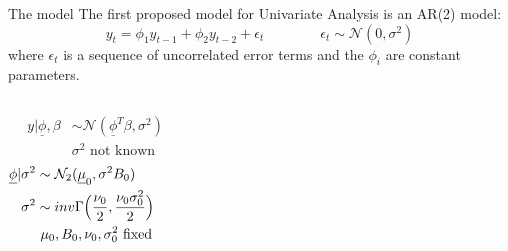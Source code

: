 \documentclass[10pt]{beamer}
\theoremstyle{remark}
\theoremstyle{definition}
\begin{document}
\begin{frame}{The model}
    The first proposed model for Univariate Analysis is an AR(2) model:
\begin{equation*}
    y_t = \phi_1 y_{t-1} + \phi_2 y_{t-2} + \epsilon_{t} \qquad \qquad \epsilon_{t} \sim \mathcal{N}(0, \sigma^2) 
\end{equation*}
where $\epsilon_{t}$ is a sequence of uncorrelated error terms and the $\phi_i$ are constant parameters.

\vspace{3mm}
\begin{columns}
        \newline\newline
        \[
        \begin{aligned} 
        y|\underline{\phi},\beta & \sim \mathcal{N}(\underline{\phi}^{T}\beta,\sigma^{2})\\
        & \text{$\sigma^{2}$ not known}
        \end{aligned}
        \]
        \newline\newline
        \[
        \begin{aligned}
	    \underline{\phi }|\sigma^2 &\sim \mathcal{N}_2(\underline\mu_0, \sigma^2B_0) \\
        \sigma^2 &\sim inv\Gamma \Bigl(\frac{\nu_0}{2}, \frac{\nu_0 \sigma_0^2}{2} \Bigr) \qquad \\
        &\text{ $\mu_0, B_0, \nu_0, \sigma_0^2$ fixed}
        \end{aligned} 
        \]
\end{columns}
\end{frame}
\end{document}
